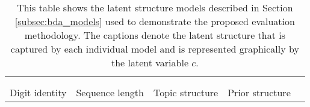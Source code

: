 \begin{table*}[t]
\begin{tabular}{ ccccc }
\begin{tikzpicture}[x=1.3cm, y=0.8cm]
    \end{tikzpicture}
    \\
    \\
    Digit identity & Sequence length & Topic structure & Prior structure \\
    \bottomrule
    \end{tabular}
    \caption{This table shows the latent structure models described in Section \ref{subsec:bda_models} used to demonstrate the proposed evaluation methodology. The captions denote the latent structure that is captured by each individual model and is represented graphically by the latent variable $c$.}
    \label{tab:BDA_diagrams}
 \end{table*}